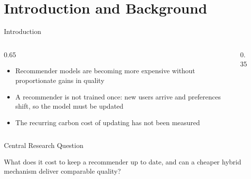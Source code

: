 
\section{Introduction and Background}


\begin{frame}{Introduction}
  \begin{columns}
      \begin{column}{0.65\textwidth}
          \vspace{4mm}
          \begin{itemize}
              \large
        \setlength\itemsep{1.5em}
            \item<1-> Recommender models are becoming more expensive without proportionate gains in quality
            \item<2-> A recommender is not trained once: new users arrive and preferences shift, so the model must be updated
            \item<3-> The recurring carbon cost of updating has not been measured
          \end{itemize}
      \end{column}
      \begin{column}{0.35\textwidth}
          \vspace{-4mm}
          \begin{center}
          \end{center}
      \end{column}
  \end{columns}
\end{frame}

\begin{frame}{Central Research Question}
    \vspace*{\fill}
    \begin{center}
        \huge What does it cost to keep a recommender up to date, and can a cheaper hybrid mechanism deliver comparable quality?
    \end{center}
\end{frame}

